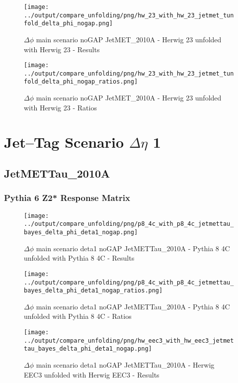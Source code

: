 \documentclass[11pt]{book}
\begin{document}
\begin{figure}[ht]
\centering
\texttt{[image: ../output/compare\_unfolding/png/hw\_23\_with\_hw\_23\_jetmet\_tunfold\_delta\_phi\_nogap.png]}
\caption{$\Delta\phi$ main scenario noGAP JetMET\_2010A - Herwig 23 unfolded with Herwig 23 - Results}
\label{hw_23_hw_23_jetmet_tunfold_delta_phi_nogap_a}
\end{figure}

\begin{figure}[ht]
\centering
\texttt{[image: ../output/compare\_unfolding/png/hw\_23\_with\_hw\_23\_jetmet\_tunfold\_delta\_phi\_nogap\_ratios.png]}
\caption{$\Delta\phi$ main scenario noGAP JetMET\_2010A - Herwig 23 unfolded with Herwig 23 - Ratios}
\label{hw_23_hw_23_jetmet_tunfold_delta_phi_nogap_b}
\end{figure}




\newpage
\chapter{Jet--Tag Scenario $\Delta\eta$ 1}
\section{JetMETTau\_2010A}
\subsection{Pythia 6 Z2* Response Matrix}



\begin{figure}[ht]
\centering
\texttt{[image: ../output/compare\_unfolding/png/p8\_4c\_with\_p8\_4c\_jetmettau\_bayes\_delta\_phi\_deta1\_nogap.png]}
\caption{$\Delta\phi$ main scenario deta1 noGAP JetMETTau\_2010A - Pythia 8 4C unfolded with Pythia 8 4C - Results}
\label{p8_p8_jetmettau_bayes_delta_phi_deta1_nogap_a}
\end{figure}

\begin{figure}[ht]
\centering
\texttt{[image: ../output/compare\_unfolding/png/p8\_4c\_with\_p8\_4c\_jetmettau\_bayes\_delta\_phi\_deta1\_nogap\_ratios.png]}
\caption{$\Delta\phi$ main scenario deta1 noGAP JetMETTau\_2010A - Pythia 8 4C unfolded with Pythia 8 4C - Ratios}
\label{p8_p8_jetmettau_bayes_delta_phi_deta1_nogap_b}
\end{figure}

\begin{figure}[ht]
\centering
\texttt{[image: ../output/compare\_unfolding/png/hw\_eec3\_with\_hw\_eec3\_jetmettau\_bayes\_delta\_phi\_deta1\_nogap.png]}
\caption{$\Delta\phi$ main scenario deta1 noGAP JetMETTau\_2010A - Herwig EEC3 unfolded with Herwig EEC3 - Results}
\label{hw_eec3_hw_eec3_jetmettau_bayes_delta_phi_deta1_nogap_a}
\end{figure}
\end{document}
